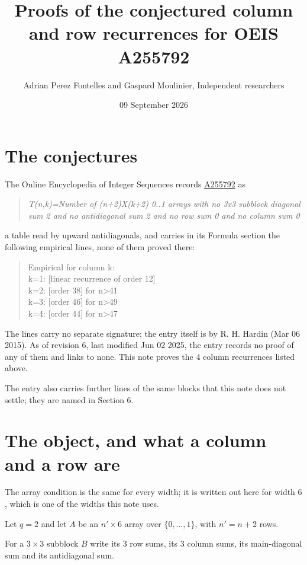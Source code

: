 \documentclass[11pt]{article}
\title{Proofs of the conjectured column and row recurrences for OEIS A255792}
\author{Adrian Perez Fontelles and Gaspard Moulinier, Independent researchers}
\date{09 September 2026}
\theoremstyle{definition}
\begin{document}
\maketitle
\section{The conjectures}

The Online Encyclopedia of Integer Sequences records \href{https://oeis.org/A255792}{A255792} as

\begin{quote}\itshape T(n,k)=Number of (n+2)X(k+2) 0..1 arrays with no 3x3 subblock diagonal sum 2 and no antidiagonal sum 2 and no row sum 0 and no column sum 0\end{quote}

a table read by upward antidiagonals, and carries in its Formula section the following empirical lines, none of them proved there:

\begin{quote}\ttfamily Empirical for column k:\\
k=1: [linear recurrence of order 12]\\k=2: [order 38] for n>41\\k=3: [order 46] for n>49\\k=4: [order 44] for n>47\end{quote}

The lines carry no separate signature; the entry itself is by R. H. Hardin (Mar 06 2015). As of revision 6, last modified Jun 02 2025, the entry records no proof of any of them and links to none. This note proves the 4 column recurrences listed above.

The entry also carries further lines of the same blocks that this note does not settle; they are named in Section 6.

\section{The object, and what a column and a row are}

The array condition is the same for every width; it is written out here for width $6$, which is one of the widths this note uses.

Let $q = 2$ and let $A$ be an $n' \times 6$ array over $\{0,\dots,1\}$, with $n' = n + 2$ rows.

For a $3\times3$ subblock $B$ write its 3 row sums, its 3 column sums, its main-diagonal sum and its antidiagonal sum.
\end{document}
